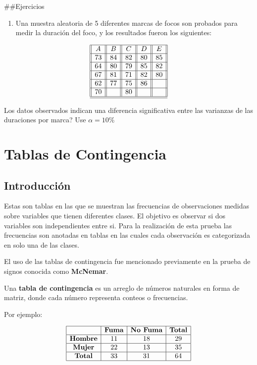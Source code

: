 \documentclass[
  a4paper,
  oneside,
  openany]{book}
\providecommand{\tightlist}{%
  \setlength{\itemsep}{0pt}\setlength{\parskip}{0pt}}
\begin{document}
\#\#Ejercicios

\begin{enumerate}
\def\labelenumi{\arabic{enumi}.}
\tightlist
\item
  Una muestra aleatoria de 5 diferentes marcas de focos son probados para medir la duración del foco, y los resultados fueron los siguientes:
\end{enumerate}

\[
\begin{array}{||c| |c| |c| |c||c||} 
\hline 
A & B&C&D&E \\ 
 \hline
73&84&82&80&85\\
 \hline
64&80&79&85&82\\
 \hline
67&81&71&82&80\\
 \hline
62&77&75&86&\\
 \hline
70&&80&&\\
\hline
\hline
\end{array}
\]

Los datos observados indican una diferencia significativa entre las varianzas de las duraciones por marca? Use \(\alpha=10\%\)

\hypertarget{part-tablas-de-contingencia}{%
\part{Tablas de Contingencia}\label{part-tablas-de-contingencia}}

\hypertarget{introducciuxf3n-3}{%
\chapter*{Introducción}\label{introducciuxf3n-3}}


Estas son tablas en las que se muestran las frecuencias de observaciones medidas sobre variables que tienen diferentes clases. El objetivo es observar si dos variables son independientes entre si. Para la realización de esta prueba las frecuencias son anotadas en tablas en las cuales cada observación es categorizada en solo una de las clases.

El uso de las tablas de contingencia fue mencionado previamente en la prueba de signos conocida como \textbf{McNemar}.

Una \textbf{tabla de contingencia} es un arreglo de números naturales en forma de matriz, donde cada número representa conteos o frecuencias.

Por ejemplo:

\[
\begin{array}{|c|c|c|c|} 
\hline
&\textbf{Fuma} &\textbf{No Fuma} &\textbf{Total}\\
\hline
\textbf{Hombre} &11 &18 &29\\
\hline
\textbf{Mujer} &22 &13 &35\\
\hline
\textbf{Total}& 33& 31 &64\\
\hline
\end{array}
\]
\end{document}

